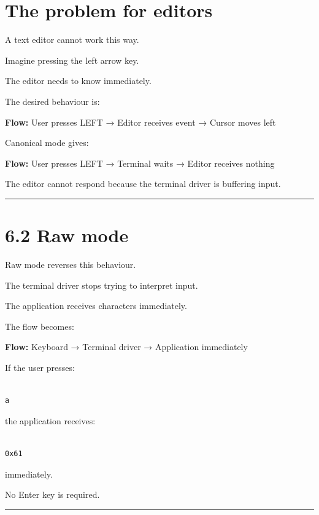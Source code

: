 \documentclass[
  oneside,
  openany]{book}
\begin{document}
\hypertarget{the-problem-for-editors}{%
\section{The problem for editors}\label{the-problem-for-editors}}

A text editor cannot work this way.

Imagine pressing the left arrow key.

The editor needs to know immediately.

The desired behaviour is:

\textbf{Flow:} User presses LEFT → Editor receives event → Cursor moves
left

Canonical mode gives:

\textbf{Flow:} User presses LEFT → Terminal waits → Editor receives
nothing

The editor cannot respond because the terminal driver is buffering
input.

\begin{center}\rule{0.5\linewidth}{0.5pt}\end{center}

\hypertarget{raw-mode}{%
\section{6.2 Raw mode}\label{raw-mode}}

Raw mode reverses this behaviour.

The terminal driver stops trying to interpret input.

The application receives characters immediately.

The flow becomes:

\textbf{Flow:} Keyboard → Terminal driver → Application immediately

If the user presses:

\begin{verbatim}

a
\end{verbatim}

the application receives:

\begin{verbatim}

0x61
\end{verbatim}

immediately.

No Enter key is required.

\begin{center}\rule{0.5\linewidth}{0.5pt}\end{center}
\end{document}
